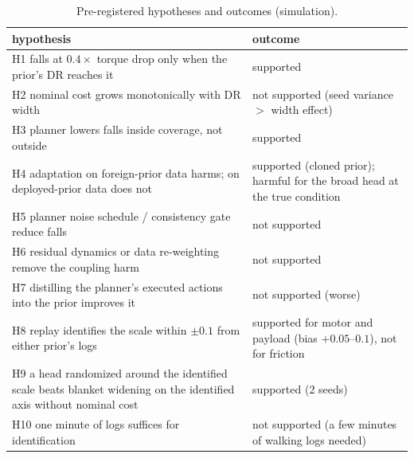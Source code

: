 \documentclass[conference]{IEEEtran}
\begin{document}
\begin{table}[t]\centering\caption{Pre-registered hypotheses and outcomes (simulation).}\label{tab:hyp}
\scriptsize\begin{tabular}{@{}p{}p{}@{}}\toprule
hypothesis & outcome\\\midrule
H1 falls at $0.4\times$ torque drop only when the prior's DR reaches it & supported\\
H2 nominal cost grows monotonically with DR width & not supported (seed variance $>$ width effect)\\
H3 planner lowers falls inside coverage, not outside & supported\\
H4 adaptation on foreign-prior data harms; on deployed-prior data does not & supported (cloned prior); harmful for the broad head at the true condition\\
H5 planner noise schedule / consistency gate reduce falls & not supported\\
H6 residual dynamics or data re-weighting remove the coupling harm & not supported\\
H7 distilling the planner's executed actions into the prior improves it & not supported (worse)\\
H8 replay identifies the scale within $\pm0.1$ from either prior's logs & supported for motor and payload (bias $+0.05$--$0.1$), not for friction\\
H9 a head randomized around the identified scale beats blanket widening on the identified axis without nominal cost & supported (2 seeds)\\
H10 one minute of logs suffices for identification & not supported (a few minutes of walking logs needed)\\\bottomrule
\end{tabular}\end{table}
\end{document}
